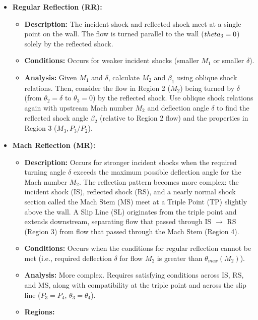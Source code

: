 \begin{itemize}
\tightlist
\item
  \textbf{Regular Reflection (RR):}

  \begin{itemize}
  \tightlist
  \item
    \textbf{Description:} The incident shock and reflected shock meet at
    a single point on the wall. The flow is turned parallel to the wall
    (\(\\theta_3=0\)) solely by the reflected shock.
  \item
    \textbf{Conditions:} Occurs for weaker incident shocks (smaller
    \(M_1\) or smaller \(\delta\)).
  \item
    \textbf{Analysis:} Given \(M_1\) and \(\delta\), calculate \(M_2\)
    and \(\beta_1\) using oblique shock relations. Then, consider the
    flow in Region 2 (\(M_2\)) being turned by \(\delta\) (from
    \(\theta_2=\delta\) to \(\theta_3=0\)) by the reflected shock. Use
    oblique shock relations again with upstream Mach number \(M_2\) and
    deflection angle \(\delta\) to find the reflected shock angle
    \(\beta_2\) (relative to Region 2 flow) and the properties in Region
    3 (\(M_3, P_3/P_2\)).
  \end{itemize}
\item
  \textbf{Mach Reflection (MR):}

  \begin{itemize}
  \tightlist
  \item
    \textbf{Description:} Occurs for stronger incident shocks when the
    required turning angle \(\delta\) exceeds the maximum possible
    deflection angle for the Mach number \(M_2\). The reflection pattern
    becomes more complex: the incident shock (IS), reflected shock (RS),
    and a nearly normal shock section called the Mach Stem (MS) meet at
    a Triple Point (TP) slightly above the wall. A Slip Line (SL)
    originates from the triple point and extends downstream, separating
    flow that passed through IS \(\to\) RS (Region 3) from flow that
    passed through the Mach Stem (Region 4).
  \item
    \textbf{Conditions:} Occurs when the conditions for regular
    reflection cannot be met (i.e., required deflection \(\delta\) for
    flow \(M_2\) is greater than \(\theta_{max}(M_2)\)).
  \item
    \textbf{Analysis:} More complex. Requires satisfying conditions
    across IS, RS, and MS, along with compatibility at the triple point
    and across the slip line (\(P_3=P_4\), \(\theta_3=\theta_4\)).
  \item
    \textbf{Regions:}


\end{itemize}
\end{itemize}
